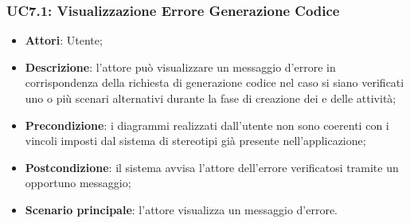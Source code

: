 \subsubsection{UC7.1: Visualizzazione Errore Generazione Codice}
\label{UC7.1}
\begin{itemize}
\item \textbf{Attori}: Utente;
\item \textbf{Descrizione}: l'attore può visualizzare un messaggio d'errore in corrispondenza della richiesta di generazione codice nel caso si siano verificati uno o più scenari alternativi durante la fase di creazione dei  e delle attività;	
\item \textbf{Precondizione}: i diagrammi realizzati dall'utente non sono coerenti con i vincoli imposti dal sistema di stereotipi già presente nell'applicazione;	
\item \textbf{Postcondizione}: il sistema avvisa l'attore dell'errore verificatosi tramite un opportuno messaggio;	
\item \textbf{Scenario principale}:
l'attore visualizza un messaggio d'errore.	
\end{itemize}


